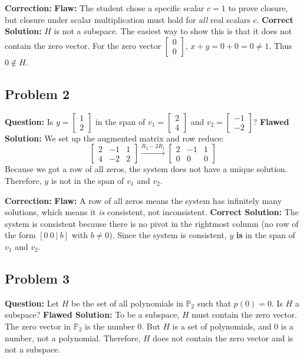 \documentclass[12pt]{article}
\begin{document}
\textbf{Correction:}
\textbf{Flaw:} The student chose a specific scalar $c=1$ to prove closure, but closure under scalar multiplication must hold for \textit{all} real scalars $c$.
\textbf{Correct Solution:} $H$ is not a subspace. The easiest way to show this is that it does not contain the zero vector. For the zero vector $\begin{bmatrix} 0 \\ 0 \end{bmatrix}$, $x+y = 0+0 = 0 \neq 1$. Thus $0 \notin H$.

\subsection{Problem 2}
\textbf{Question:} Is $y = \begin{bmatrix} 1 \\ 2 \end{bmatrix}$ in the span of $v_1 = \begin{bmatrix} 2 \\ 4 \end{bmatrix}$ and $v_2 = \begin{bmatrix} -1 \\ -2 \end{bmatrix}$?
\textbf{Flawed Solution:}
We set up the augmented matrix and row reduce:
\[ \begin{bmatrix} 2 & -1 & 1 \\ 4 & -2 & 2 \end{bmatrix} \xrightarrow{R_2 - 2R_1} \begin{bmatrix} 2 & -1 & 1 \\ 0 & 0 & 0 \end{bmatrix} \]
Because we got a row of all zeros, the system does not have a unique solution. Therefore, $y$ is not in the span of $v_1$ and $v_2$.

\textbf{Correction:}
\textbf{Flaw:} A row of all zeros means the system has infinitely many solutions, which means it \textit{is} consistent, not inconsistent.
\textbf{Correct Solution:} The system is consistent because there is no pivot in the rightmost column (no row of the form $[0 \ 0 \ | \ b]$ with $b \neq 0$). Since the system is consistent, $y$ \textbf{is} in the span of $v_1$ and $v_2$.

\subsection{Problem 3}
\textbf{Question:} Let $H$ be the set of all polynomials in $\mathbb{P}_2$ such that $p(0) = 0$. Is $H$ a subspace?
\textbf{Flawed Solution:}
To be a subspace, $H$ must contain the zero vector. The zero vector in $\mathbb{P}_2$ is the number $0$. But $H$ is a set of polynomials, and $0$ is a number, not a polynomial. Therefore, $H$ does not contain the zero vector and is not a subspace.
\end{document}
